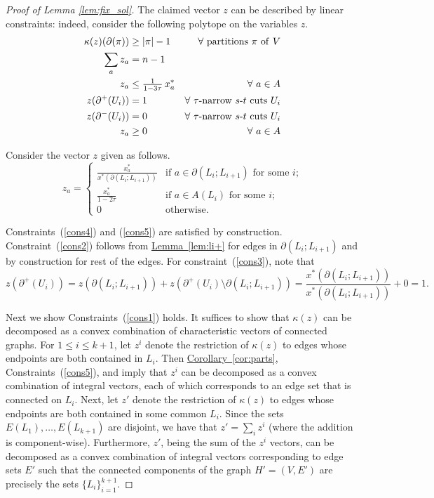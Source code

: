 \documentclass[11pt]{article}
\newcommand{\lref}[2][]{\hyperref[#2]{#1~\ref*{#2}}}
\theoremstyle{definition}
\newcounter{note}[section]
\begin{document}
\begin{proof}[Proof of Lemma \ref{lem:fix_sol}]
  The claimed vector $z$ can be described by linear constraints: indeed,
  consider the following polytope on the variables $z$.
\begin{align}
\kappa(z)(\partial(\pi)) & \geq  |\pi|-1 &\forall {\rm ~partitions~}
    \pi {\rm ~of~ }V \label{cons1}  \\
    \sum_a z_a & = n-1 & \label{cons1-1} \\
    z_a & \leq  {\textstyle \frac{1}{1-3\tau}} \, x^*_a & \forall~ a \in
    A \label{cons2}\\
    z(\partial^+(U_i)) & =  1 & \forall~ \tau\text{-narrow~}\text{$s$-$t$}{\rm
      ~cuts~} U_i \label{cons3}\\
    z(\partial^-(U_i)) & =  0 & \forall~ \tau\text{-narrow~}\text{$s$-$t$}{\rm ~cuts~}
    U_i\label{cons4}\\
    z_a&\geq 0  &\forall~a\in A \label{cons5}
\end{align}

Consider the vector $z$ given as follows.
\begin{equation}
\label{eq:7}
z_{a} = \begin{cases}
\frac{x_a^*}{x^*(\partial(L_i;L_{i+1}))} & \text{if $a \in \partial(L_i;L_{i+1})$ for some $i$;}\\
\frac{x_a^*}{1-2\tau} & \text{if $a\in A(L_i)$ for some $i$;}\\
0 & \text{otherwise.}
\end{cases}
\end{equation}

Constraints~(\ref{cons4}) and (\ref{cons5}) are satisfied by
construction. Constraint~(\ref{cons2}) follows from \lref[Lemma]{lem:li+}
for edges in $\partial(L_i;L_{i+1})$ and by construction for rest of the
edges. For constraint~(\ref{cons3}), note that
\[
z(\partial^+(U_i))=z(\partial(L_i;L_{i+1}))+z(\partial^+(U_i)\setminus
\partial(L_i;L_{i+1}))=\frac{x^*(\partial(L_i;L_{i+1}))}{x^*(\partial(L_i;L_{i+1}))}+0=1.
\]

Next we show Constraints~(\ref{cons1}) holds.  It suffices to
show that $\kappa(z)$ can be decomposed as a convex combination of characteristic
vectors of connected graphs. For
$1 \leq i \leq k+1$, let $z^i$ denote the restriction of $\kappa(z)$ to
edges whose endpoints are both contained in $L_i$. Then
\lref[Corollary]{cor:parts}, Constraints~(\ref{cons5}), and
\cite[Corollary~50.8a]{Schrijver-book} imply that $z^i$ can be
decomposed as a convex combination of integral vectors, each of which
corresponds to an edge set that is connected on $L_i$.  Next, let $z'$
denote the restriction of $\kappa(z)$ to edges whose endpoints are both
contained in some common $L_i$. Since the sets $E(L_1), \ldots,
E(L_{k+1})$ are disjoint, we have that $z' = \sum_i z^i$ (where the
addition is component-wise). Furthermore,
$z'$, being the sum of the $z^i$ vectors,
can be decomposed as a convex combination of integral vectors
corresponding to edge sets $E'$ such that the connected components of
the graph $H' = (V, E')$ are precisely the sets
$\{L_i\}_{i=1}^{k+1}$.



\end{proof}
\end{document}
